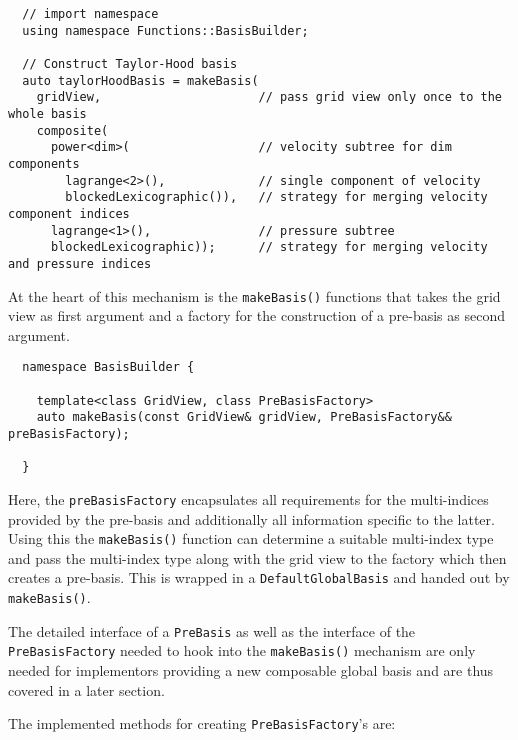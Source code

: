 \documentclass[a4paper,10pt,headings=normal,bibliography=totoc]{scrartcl}
\newcommand{\cpp}[1]{\lstinline[basicstyle=\ttfamily]!#1!}
\begin{document}
\begin{lstlisting}
  // import namespace
  using namespace Functions::BasisBuilder;

  // Construct Taylor-Hood basis
  auto taylorHoodBasis = makeBasis(
    gridView,                      // pass grid view only once to the whole basis
    composite(
      power<dim>(                  // velocity subtree for dim components
        lagrange<2>(),             // single component of velocity
        blockedLexicographic()),   // strategy for merging velocity component indices
      lagrange<1>(),               // pressure subtree
      blockedLexicographic));      // strategy for merging velocity and pressure indices
\end{lstlisting}

At the heart of this mechanism is the \cpp{makeBasis()} functions
that takes the grid view as first argument and a factory for the
construction of a pre-basis as second argument.

\begin{lstlisting}
  namespace BasisBuilder {

    template<class GridView, class PreBasisFactory>
    auto makeBasis(const GridView& gridView, PreBasisFactory&& preBasisFactory);

  }
\end{lstlisting}

Here, the \cpp{preBasisFactory} encapsulates all requirements
for the multi-indices provided by the pre-basis and additionally
all information specific to the latter. Using this the \cpp{makeBasis()}
function can determine a suitable multi-index type and pass the
multi-index type along with the grid view to the factory which
then creates a pre-basis. This is wrapped in a \cpp{DefaultGlobalBasis}
and handed out by \cpp{makeBasis()}.

The detailed interface of a \cpp{PreBasis} as well as the
interface of the \cpp{PreBasisFactory} needed to hook into
the \cpp{makeBasis()} mechanism are only needed for implementors providing
a new composable global basis and are thus covered in a later section.

The implemented methods for creating \cpp{PreBasisFactory}'s are:
\end{document}
